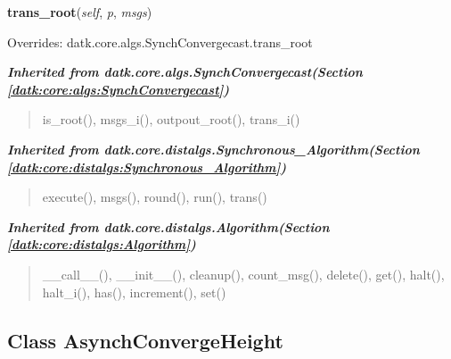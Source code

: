     \vspace{0.5ex}

\hspace{.8\funcindent}\begin{boxedminipage}{\funcwidth}

    \raggedright \textbf{trans\_root}(\textit{self}, \textit{p}, \textit{msgs})

\setlength{\parskip}{2ex}
\setlength{\parskip}{1ex}
      Overrides: datk.core.algs.SynchConvergecast.trans\_root

    \end{boxedminipage}


\large{\textbf{\textit{Inherited from datk.core.algs.SynchConvergecast\textit{(Section \ref{datk:core:algs:SynchConvergecast})}}}}

\begin{quote}
is\_root(), msgs\_i(), outpout\_root(), trans\_i()
\end{quote}

\large{\textbf{\textit{Inherited from datk.core.distalgs.Synchronous\_Algorithm\textit{(Section \ref{datk:core:distalgs:Synchronous_Algorithm})}}}}

\begin{quote}
execute(), msgs(), round(), run(), trans()
\end{quote}

\large{\textbf{\textit{Inherited from datk.core.distalgs.Algorithm\textit{(Section \ref{datk:core:distalgs:Algorithm})}}}}

\begin{quote}
\_\_call\_\_(), \_\_init\_\_(), cleanup(), count\_msg(), delete(), get(), halt(), halt\_i(), has(), increment(), set()
\end{quote}


\subsection{Class AsynchConvergeHeight}

